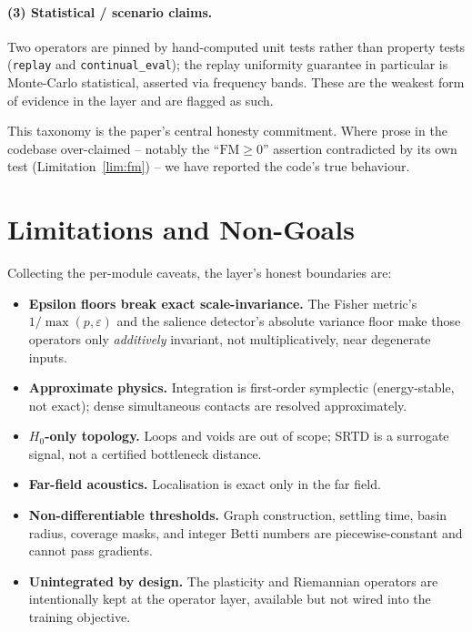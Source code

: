 \documentclass[11pt]{article}
\theoremstyle{definition}
\newcommand{\code}[1]{\texttt{#1}}
\newcommand{\eps}{\varepsilon}
\begin{document}
\paragraph{(3) Statistical / scenario claims.} Two operators are pinned by
hand-computed unit tests rather than property tests (\code{replay} and
\code{continual\_eval}); the replay uniformity guarantee in particular is
Monte-Carlo statistical, asserted via frequency bands. These are the weakest
form of evidence in the layer and are flagged as such.

This taxonomy is the paper's central honesty commitment. Where prose in the
codebase over-claimed -- notably the ``$\text{FM}\ge 0$'' assertion
contradicted by its own test (Limitation~\ref{lim:fm}) -- we have reported
the code's true behaviour.

\section{Limitations and Non-Goals}\label{sec:limitations}
Collecting the per-module caveats, the layer's honest boundaries are:
\begin{itemize}[leftmargin=1.4em]
\item \textbf{Epsilon floors break exact scale-invariance.} The Fisher
metric's $1/\max(p,\eps)$ and the salience detector's absolute variance
floor make those operators only \emph{additively} invariant, not
multiplicatively, near degenerate inputs.
\item \textbf{Approximate physics.} Integration is first-order
symplectic (energy-stable, not exact); dense simultaneous contacts are
resolved approximately.
\item \textbf{$H_0$-only topology.} Loops and voids are out of scope; SRTD
is a surrogate signal, not a certified bottleneck distance.
\item \textbf{Far-field acoustics.} Localisation is exact only in the
far field.
\item \textbf{Non-differentiable thresholds.} Graph construction, settling
time, basin radius, coverage masks, and integer Betti numbers are
piecewise-constant and cannot pass gradients.
\item \textbf{Unintegrated by design.} The plasticity and Riemannian
operators are intentionally kept at the operator layer, available but not
wired into the training objective.
\end{itemize}
\end{document}

